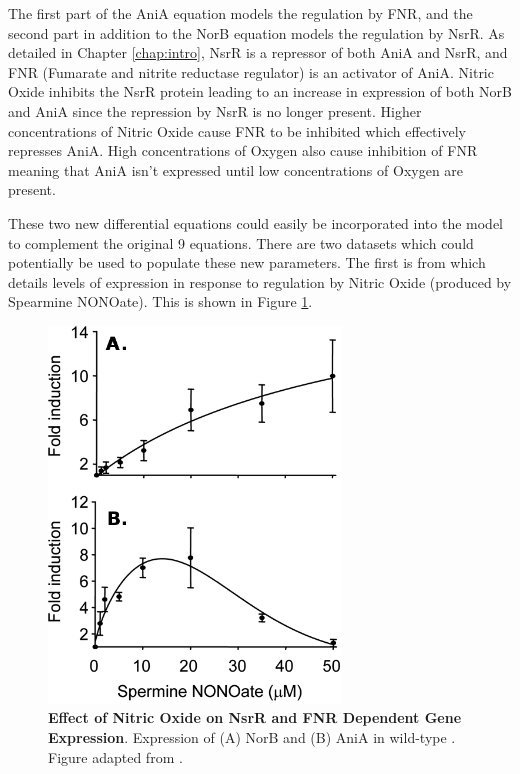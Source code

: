 The first part of the AniA equation models the regulation by FNR, and the second part in addition to the NorB equation models the regulation by NsrR. As detailed in Chapter \ref{chap:intro}, NsrR is a repressor of both AniA and NsrR, and FNR (Fumarate and nitrite reductase regulator) is an activator of AniA. Nitric Oxide inhibits the NsrR protein leading to an increase in expression of both NorB and AniA since the repression by NsrR is no longer present. Higher concentrations of Nitric Oxide cause FNR to be inhibited which effectively represses AniA. High concentrations of Oxygen also cause inhibition of FNR meaning that AniA isn't expressed until low concentrations of Oxygen are present.

These two new differential equations could easily be incorporated into the model to complement the original 9 equations. There are two datasets which could potentially be used to populate these new parameters. The first is from \citet{Heurlier2008} which details levels of expression in response to regulation by Nitric Oxide (produced by Spearmine NONOate). This is shown in Figure \ref{fig:expression1}.
\begin{figure}[tbp]
 \centering
 \includegraphics[height=10cm]{./08-expression/data/zjb0070877000001.png}
 \caption[Effect of Nitric Oxide on NsrR and FNR Dependent Gene Expression]{{\bf Effect of Nitric Oxide on NsrR and FNR Dependent Gene Expression}. Expression of (A) NorB and (B) AniA in wild-type \Nsm{}. Figure adapted from \citet{Heurlier2008}.
 \label{fig:expression1}}
\end{figure}
